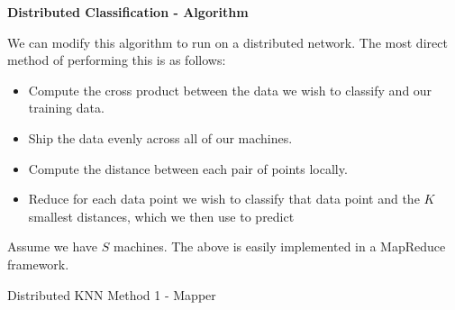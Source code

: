 \vspace{5 mm}
\noindent
\textbf{Distributed Classification - Algorithm}

\vspace{5 mm}
\noindent
We can modify this algorithm to run on a distributed network. The most direct 
method of performing this is as follows:

\begin{itemize}
\item Compute the cross product between the data we wish to classify and our 
training data.
\item Ship the data evenly across all of our machines.
\item Compute the distance between each pair of points locally.
\item Reduce for each data point we wish to classify that data point and the 
$K$ smallest distances, which we then use to predict
\end{itemize}

\vspace{5 mm}
\noindent
Assume we have $S$ machines. The above is easily implemented in a MapReduce 
framework.

\begin{algorithm}[ht!]
\DontPrintSemicolon
{}
\caption{Distributed KNN Method 1 - Mapper\label{KNN1m}}
\end{algorithm}

